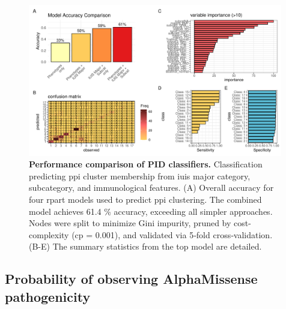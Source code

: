 \begin{figure}[ht]
  \centering
  \includegraphics[width=0.99\textwidth]{../images/plot_multicat_performance_combined.pdf}
  \caption{\textbf{Performance comparison of PID classifiers.} Classification predicting \ac{ppi} cluster membership from \ac{iuis} major category, subcategory, and immunological features. (A) Overall accuracy for four rpart models
used to predict \ac{ppi} clustering. The combined model achieves 61.4 \% accuracy, exceeding all simpler approaches. 
Nodes were split to minimize Gini impurity, pruned by cost-complexity (cp = 0.001), and validated via 5‑fold cross‑validation. %
(B-E) The summary statistics from the top model are detailed.  
}
  \label{fig:multicat_performance_combined}
\end{figure}


\FloatBarrier
\clearpage
\subsection{Probability of observing AlphaMissense pathogenicity}

